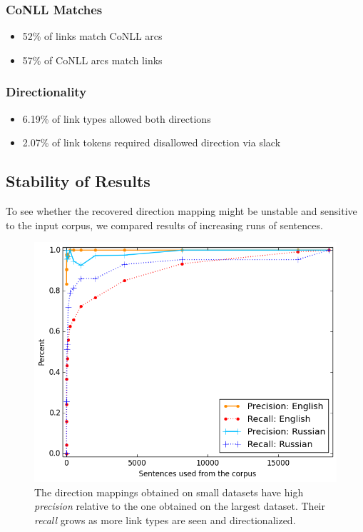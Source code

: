 \documentclass[a0,landscape]{a0poster}
\begin{document}
\begin{multicols}{4}
\subsubsection*{CoNLL Matches}
\begin{itemize}
\item[] 52\% of links match CoNLL arcs
\item[] 57\% of CoNLL arcs match links
\end{itemize}

\subsubsection*{Directionality}
\begin{itemize}
\item[] 6.19\% of link types allowed both directions %
\item[] 2.07\% of link tokens required disallowed direction via slack %
\end{itemize}

\subsection*{Stability of Results}
To see whether the recovered direction mapping might be unstable and sensitive to the input corpus, we compared results of increasing runs of sentences. 
\begin{figure}[H]
  \centering
  \includegraphics[width=0.6\linewidth]{precision_recall.png}
  \caption*{The direction mappings obtained on small datasets have high {\em precision} relative to the one obtained on the largest dataset.  Their {\em recall} grows as more link types are seen and directionalized.}\label{fig:convergence}
\end{figure}  


\end{multicols}
\end{document}
